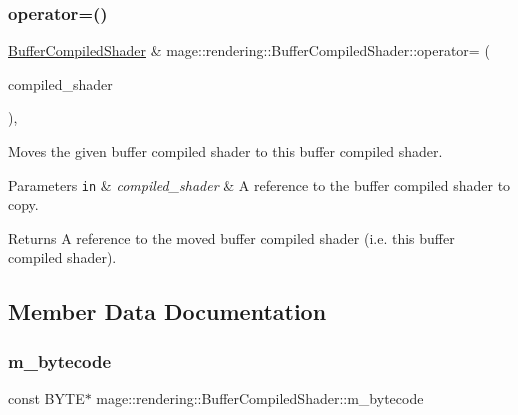 \subsubsection{\texorpdfstring{operator=()}{operator=()}\hspace{0.1cm}{\footnotesize\ttfamily [2/2]}}
{\footnotesize\ttfamily \mbox{\hyperlink{classmage_1_1rendering_1_1_buffer_compiled_shader}{Buffer\+Compiled\+Shader}} \& mage\+::rendering\+::\+Buffer\+Compiled\+Shader\+::operator= (\begin{DoxyParamCaption}\item[{\mbox{\hyperlink{classmage_1_1rendering_1_1_buffer_compiled_shader}{Buffer\+Compiled\+Shader}} \&\&}]{compiled\+\_\+shader }\end{DoxyParamCaption})\hspace{0.3cm}{\ttfamily [default]}, {\ttfamily [noexcept]}}

Moves the given buffer compiled shader to this buffer compiled shader.


\begin{DoxyParams}[1]{Parameters}
\mbox{\tt in}  & {\em compiled\+\_\+shader} & A reference to the buffer compiled shader to copy. \\
\hline
\end{DoxyParams}
\begin{DoxyReturn}{Returns}
A reference to the moved buffer compiled shader (i.\+e. this buffer compiled shader). 
\end{DoxyReturn}


\subsection{Member Data Documentation}
\mbox{\label{classmage_1_1rendering_1_1_buffer_compiled_shader_a6caa56491d81612c3eaec789d8e341bc}} 
\subsubsection{\texorpdfstring{m\+\_\+bytecode}{m\_bytecode}}
{\footnotesize\ttfamily const B\+Y\+TE$\ast$ mage\+::rendering\+::\+Buffer\+Compiled\+Shader\+::m\+\_\+bytecode\hspace{0.3cm}{\ttfamily [private]}}


